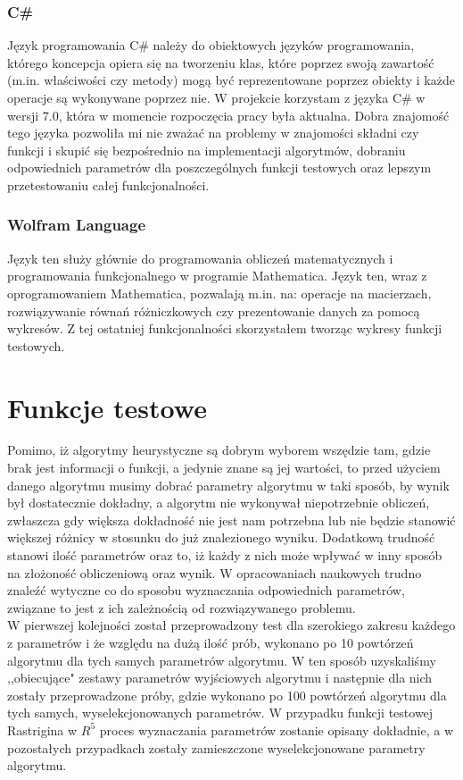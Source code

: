 \documentclass[twoside]{projektInzynierskiMS1}
\newcommand{\si}{ś}
\begin{document}
	\subsubsection{C\#}
Język programowania C\# należy do obiektowych języków programowania, którego koncepcja opiera się na tworzeniu klas, które poprzez swoją zawarto\si ć (m.in. wła\si ciwo\si ci czy metody) mogą być reprezentowane poprzez obiekty i każde operacje są wykonywane poprzez nie. W projekcie korzystam z języka C\# w wersji 7.0, która w momencie rozpoczęcia pracy była aktualna. Dobra znajomo\si ć tego języka pozwoliła mi nie zważać na problemy w znajomo\si ci składni czy funkcji i skupić się bezpo\si rednio na implementacji algorytmów, dobraniu odpowiednich parametrów dla poszczególnych funkcji testowych oraz lepszym przetestowaniu całej funkcjonalno\si ci.

\subsubsection{Wolfram Language}
Język ten służy głównie do programowania obliczeń matematycznych i programowania funkcjonalnego w programie Mathematica. Język ten, wraz z oprogramowaniem Mathematica, pozwalają m.in. na: operacje na macierzach, rozwiązywanie równań różniczkowych czy prezentowanie danych za pomocą wykresów. Z tej ostatniej funkcjonalno\si ci skorzystałem tworząc wykresy funkcji testowych.

\section{Funkcje testowe}
Pomimo, iż algorytmy heurystyczne są dobrym wyborem wszędzie tam, gdzie brak jest informacji o funkcji, a jedynie znane są jej warto\si ci, to przed użyciem danego algorytmu musimy dobrać parametry algorytmu w taki sposób, by wynik był dostatecznie dokładny, a algorytm nie wykonywał niepotrzebnie obliczeń, zwłaszcza gdy większa dokładno\si ć nie jest nam potrzebna lub nie będzie stanowić większej różnicy w stosunku do już znalezionego wyniku. Dodatkową trudno\si ć stanowi ilo\si ć parametrów oraz to, iż każdy z nich może wpływać w inny sposób na złożono\si ć obliczeniową oraz wynik. W opracowaniach naukowych trudno znaleźć wytyczne co do sposobu wyznaczania odpowiednich parametrów, związane to jest z ich zależno\si cią od rozwiązywanego problemu. \\




W pierwszej kolejno\si ci został przeprowadzony test dla szerokiego zakresu każdego z parametrów i że względu na dużą ilo\si ć prób, wykonano po 10 powtórzeń algorytmu dla tych samych parametrów algorytmu. W ten sposób uzyskali\si my ,,obiecujące" zestawy parametrów wyj\si ciowych algorytmu i następnie dla nich zostały przeprowadzone próby, gdzie wykonano po 100 powtórzeń algorytmu dla tych samych, wyselekcjonowanych parametrów. W przypadku funkcji testowej Rastrigina w $R^5$ proces wyznaczania parametrów zostanie opisany dokładnie, a w pozostałych przypadkach zostały zamieszczone wyselekcjonowane parametry algorytmu.
\end{document}
